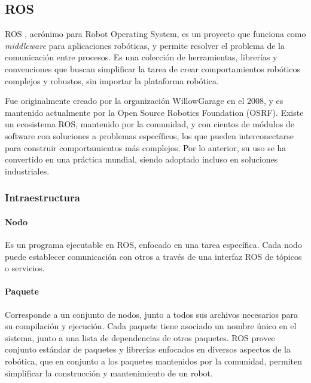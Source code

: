 \subsection{ROS}

ROS \cite{ROS:2009}, acrónimo para Robot Operating System, es un proyecto que funciona como \textit{middleware} para aplicaciones robóticas, y permite resolver el problema de la comunicación entre procesos. Es una colección de herramientas, librerías y convenciones que buscan simplificar la tarea de crear comportamientos robóticos complejos y robustos, sin importar la plataforma robótica.

Fue originalmente creado por la organización WillowGarage en el 2008, y es mantenido actualmente por la Open Source Robotics Foundation (OSRF). Existe un ecosistema ROS, mantenido por la comunidad, y con cientos de módulos de software con soluciones a problemas específicos, los que pueden interconectarse para construir comportamientos más complejos. Por lo anterior, su uso se ha convertido en una práctica mundial, siendo adoptado incluso en soluciones industriales.

\subsubsection{Intraestructura}

\paragraph{Nodo}
Es un programa ejecutable en ROS, enfocado en una tarea específica. Cada nodo puede establecer comunicación con otros a través de una interfaz ROS de tópicos o servicios.

\paragraph{Paquete}
Corresponde a un conjunto de nodos, junto a todos sus archivos necesarios para su compilación y ejecución. Cada paquete tiene asociado un nombre único en el sistema, junto a una lista de dependencias de otros paquetes. ROS provee conjunto estándar de paquetes y librerías enfocados en diversos aspectos de la robótica, que en conjunto a los paquetes mantenidos por la comunidad, permiten simplificar la construcción y mantenimiento de un robot.

